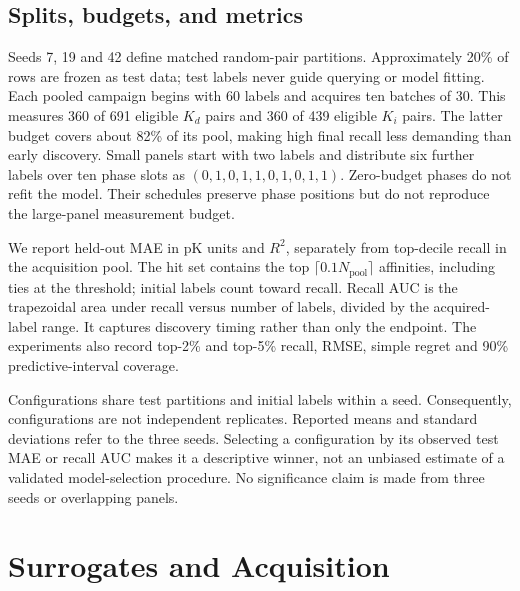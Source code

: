 \documentclass[wcp]{jmlr}
\begin{document}
\subsection{Splits, budgets, and metrics}
Seeds 7, 19 and 42 define matched random-pair partitions. Approximately
20\% of rows are frozen as test data; test labels never guide querying or
model fitting. Each pooled campaign begins with 60 labels and acquires
ten batches of 30. This measures 360 of 691 eligible $K_d$ pairs and 360
of 439 eligible $K_i$ pairs. The latter budget covers about 82\% of its
pool, making high final recall less demanding than early discovery.
Small panels start with two labels and distribute six further labels
over ten phase slots as $(0,1,0,1,1,0,1,0,1,1)$. Zero-budget phases do not
refit the model. Their schedules preserve phase positions but do not
reproduce the large-panel measurement budget.

We report held-out MAE in pK units and $R^2$, separately from top-decile
recall in the acquisition pool. The hit set contains the top
$\lceil0.1N_{\mathrm{pool}}\rceil$ affinities, including ties at the threshold;
initial labels count toward recall. Recall AUC is the trapezoidal area
under recall versus number of labels, divided by the acquired-label range.
It captures discovery timing rather than only the endpoint. The experiments
also record top-2\% and top-5\% recall, RMSE, simple regret and 90\%
predictive-interval coverage.

Configurations share test partitions and initial labels within a seed.
Consequently, configurations are not independent replicates. Reported
means and standard deviations refer to the three seeds. Selecting a
configuration by its observed test MAE or recall AUC makes it a descriptive
winner, not an unbiased estimate of a validated model-selection procedure.
No significance claim is made from three seeds or overlapping panels.

\section{Surrogates and Acquisition}
\end{document}
